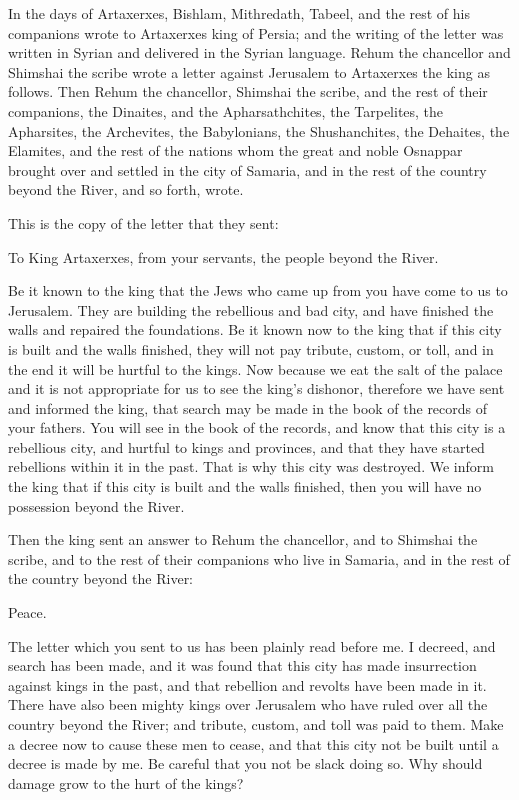 \myverse{}In the days of Artaxerxes, Bishlam, Mithredath, Tabeel, and the
rest of his companions wrote to Artaxerxes king of Persia; and the writing of the letter was written in
Syrian and delivered in the Syrian language.
\myverse{}Rehum the chancellor and Shimshai the scribe wrote a letter against Jerusalem
to Artaxerxes the king as follows.
\myverse{}Then Rehum the chancellor, Shimshai the scribe, and the rest of their companions,
the Dinaites, and the Apharsathchites, the Tarpelites, the Apharsites, the Archevites, the Babylonians,
the Shushanchites, the Dehaites, the Elamites,
\myverse{}and the rest of the nations whom the great and noble Osnappar brought over
and settled in the city of Samaria, and in the rest of the country beyond the River, and so forth, wrote.

\myverse{}This is the copy of the letter that they sent:

\vspace{\baselineskip} 
To King Artaxerxes, from your servants, the people beyond the River.

\myverse{}Be it known to the king that the Jews who came up
from you have come to us to Jerusalem. They are building the rebellious and bad city, and have finished
the walls and repaired the foundations.
\myverse{}Be it known now to the king that if this city is built and the walls finished,
they will not pay tribute, custom, or toll, and in the end it will be hurtful to the kings.
\myverse{}Now because we eat the salt of the palace and it is not appropriate for us
to see the king’s dishonor, therefore we have sent and informed the king,
\myverse{}that search may be made in the book of the records of your fathers. You will
see in the book of the records, and know that this city is a rebellious city, and hurtful to kings and
provinces, and that they have started rebellions within it in the past. That is why this city was destroyed.
\myverse{}We inform the king that if this city is built and the walls finished, then
you will have no possession beyond the River.


\vspace{\baselineskip} \myverse{}Then the king sent an answer to Rehum the chancellor, and to
Shimshai the scribe, and to the rest of their companions who live in Samaria, and in the rest of the country
beyond the River:

\vspace{\baselineskip} 
Peace.


\vspace{\baselineskip} \myverse{}The letter which you sent to us has been plainly read
before me.
\myverse{}I decreed, and search has been made, and it was found that this city has made
insurrection against kings in the past, and that rebellion and revolts have been made in it.
\myverse{}There have also been mighty kings over Jerusalem who have ruled over all the
country beyond the River; and tribute, custom, and toll was paid to them.
\myverse{}Make a decree now to cause these men to cease, and that this city not be built
until a decree is made by me.
\myverse{}Be careful that you not be slack doing so. Why should damage grow to the hurt
of the kings?


